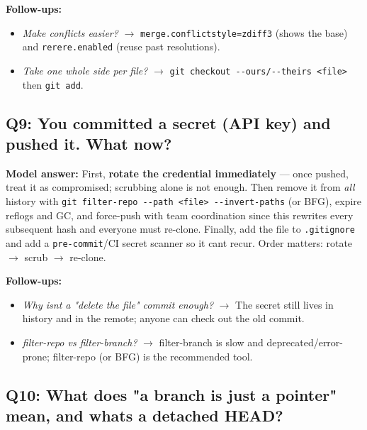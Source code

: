 \documentclass[11pt]{article}
\providecommand{\tightlist}{\setlength{\itemsep}{1pt}\setlength{\parskip}{0pt}}
\begin{document}
\textbf{Follow-ups:}

\begin{itemize}
\tightlist
\item
  \emph{Make conflicts easier?} \(\rightarrow\) \texttt{merge.conflictstyle=zdiff3} (shows the base) and \texttt{rerere.enabled} (reuse past resolutions).
\item
  \emph{Take one whole side per file?} \(\rightarrow\) \texttt{git\ checkout\ -\/-ours/-\/-theirs\ \textless{}file\textgreater{}} then \texttt{git\ add}.
\end{itemize}

\subsection{Q9: You committed a secret (API key) and pushed it. What now?}\label{q9-you-committed-a-secret-api-key-and-pushed-it-what-now}

\textbf{Model answer:} First, \textbf{rotate the credential immediately} --- once pushed, treat it as compromised; scrubbing alone is not enough. Then remove it from \emph{all} history with \texttt{git\ filter-repo\ -\/-path\ \textless{}file\textgreater{}\ -\/-invert-paths} (or BFG), expire reflogs and GC, and force-push with team coordination since this rewrites every subsequent hash and everyone must re-clone. Finally, add the file to \texttt{.gitignore} and add a \texttt{pre-commit}/CI secret scanner so it can\textquotesingle t recur. Order matters: rotate \(\rightarrow\) scrub \(\rightarrow\) re-clone.

\textbf{Follow-ups:}

\begin{itemize}
\tightlist
\item
  \emph{Why isn\textquotesingle t a "delete the file" commit enough?} \(\rightarrow\) The secret still lives in history and in the remote; anyone can check out the old commit.
\item
  \emph{filter-repo vs filter-branch?} \(\rightarrow\) filter-branch is slow and deprecated/error-prone; filter-repo (or BFG) is the recommended tool.
\end{itemize}

\subsection{Q10: What does "a branch is just a pointer" mean, and what\textquotesingle s a detached HEAD?}\label{q10-what-does-a-branch-is-just-a-pointer-mean-and-whats-a-detached-head}
\end{document}

